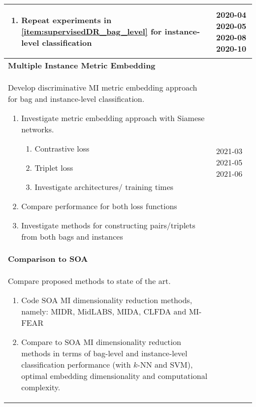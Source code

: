 \begin{longtable}{|p{10cm}|p{4cm}|}
\begin{enumerate}
		\item Repeat experiments in \ref{item:supervisedDR_bag_level} for instance-level classification
	\end{enumerate} & \newline \vspace{1cm} 2020-04 \newline \vspace{5.8cm} 2020-05 \newline \vspace{3.1cm} 2020-08 \newline \vspace{6cm} 2020-10\\ 
	\hline
	\multicolumn{2}{|l|}{\textbf{Multiple Instance Metric Embedding}} \\
	\hline
	Develop discriminative MI metric embedding approach for bag and instance-level classification. 
	\begin{enumerate}
		\item Investigate metric embedding approach with Siamese networks.
		\begin{enumerate}
			\item Contrastive loss
			\item Triplet loss
			\item Investigate architectures/ training times
		\end{enumerate}
		\item Compare performance for both loss functions
		\item Investigate methods for constructing pairs/triplets from both bags and instances 
	\end{enumerate} & \newline \vspace{1.1cm} 2021-03 \newline \vspace{3.1cm} 2021-05 \newline \vspace{0.1cm} 2021-06\\
	\hline
	\multicolumn{2}{|l|}{\textbf{Comparison to SOA}} \\
	\hline
	Compare proposed methods to state of the art.
	\begin{enumerate}
		\item Code SOA MI dimensionality reduction methods, namely: MIDR, MidLABS, MIDA, CLFDA and MI-FEAR
		\item Compare to SOA MI dimensionality reduction methods in terms of bag-level and instance-level classification performance (with $k$-NN and SVM), optimal embedding dimensionality and computational complexity.

\end{enumerate}
\end{longtable}

